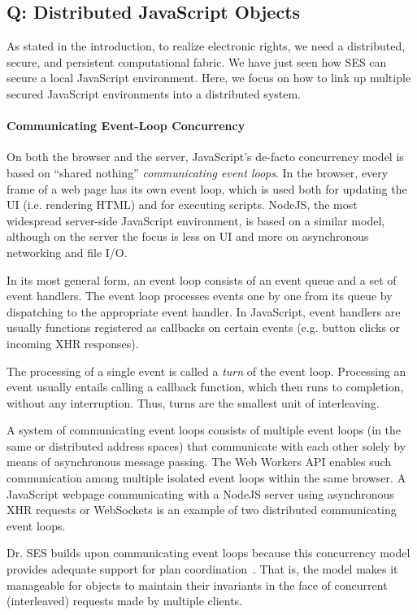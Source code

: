 \documentclass{llncs}
\begin{document}
\subsection{Q: Distributed JavaScript Objects}
\label{Q}

As stated in the introduction, to realize electronic rights, we need a distributed, secure, and persistent computational fabric. We have just seen how SES can secure a local JavaScript environment. Here, we focus on how to link up multiple secured JavaScript environments into a distributed system.


\paragraph{Communicating Event-Loop Concurrency}

On both the browser and the server, JavaScript's de-facto concurrency model is based on ``shared nothing'' \emph{communicating event loops}. In the browser, every frame of a web page has its own event loop, which is used both for updating the UI (i.e. rendering HTML) and for executing scripts. NodeJS, the most widespread server-side JavaScript environment, is based on a similar model, although on the server the focus is less on UI and more on asynchronous networking and file I/O.

In its most general form, an event loop consists of an event queue and a set of event handlers. The event loop processes events one by one from its queue by dispatching to the appropriate event handler. In JavaScript, event handlers are usually functions registered as callbacks on certain events (e.g. button clicks or incoming XHR responses).

The processing of a single event is called a \emph{turn} of the event loop. Processing an event usually entails calling a callback function, which then runs to completion, without any interruption. Thus, turns are the smallest unit of interleaving.

A system of communicating event loops consists of multiple event loops (in the same or distributed address spaces) that communicate with each other solely by means of asynchronous message passing. The Web Workers API enables such communication among multiple isolated event loops within the same browser. A JavaScript webpage communicating with a NodeJS server using asynchronous XHR requests or WebSockets is an example of two distributed communicating event loops.

Dr. SES builds upon communicating event loops because this concurrency model provides adequate support for plan coordination~\cite{miller:strangers}. That is, the model makes it manageable for objects to maintain their invariants in the face of concurrent (interleaved) requests made by multiple clients.
\end{document}
